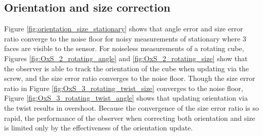 \subsection{Orientation and size correction}      
Figure \ref{fig:orientation_size_stationary} shows that angle error and size error ratio converge to the noise floor for noisy measurements of stationary where 3 faces are visible to the sensor.
For noiseless measurements of a rotating cube, Figures \ref{fig:OxS_2_rotating_angle} and \ref{fig:OxS_2_rotating_size} show that the observer is able to track the orientation of the cube when updating via the screw, and the size error ratio converges to the noise floor.
Though the size error ratio in Figure \ref{fig:OxS_3_rotating_twist_size} converges to the noise floor, Figure \ref{fig:OxS_3_rotating_twist_angle} shows that updating orientation via the twist results in overshoot.
Because the convergence of the size error ratio is so rapid, the performance of the observer when correcting both orientation and size is limited only by the effectiveness of the orientation update.

